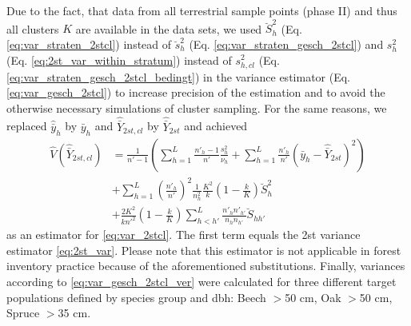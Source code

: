 Due to the fact, that data from all terrestrial sample points (phase II) and thus all clusters $K$ are available in the data sets, we used $\breve{S}_h^2$ (Eq. \ref{eq:var_straten_2stcl}) instead of $\breve{s}_h^2$ (Eq. \ref{eq:var_straten_gesch_2stcl}) and $s_{h}^2$ (Eq. \ref{eq:2st_var_within_stratum}) instead of $s_{h,cl}^2$ (Eq. \ref{eq:var_straten_gesch_2stcl_bedingt}) in the variance estimator (Eq. \ref{eq:var_gesch_2stcl}) to increase precision of the estimation and to avoid the otherwise necessary simulations of cluster sampling. For the same reasons, we replaced $\hat{\bar{y}}_h$ by $\bar{y}_h$ and $\hat{\bar{Y}}_{2st,cl}$ by $\hat{\bar{Y}}_{2st}$ and achieved
\begin{equation}
\begin{aligned}
\hat{V}\left(\hat{\bar{Y}}_{2st,cl}\right)&=\frac{1}{n'-1}\left(\sum_{h=1}^{L}\frac{n'_h-1}{n'}\frac{s^2_{h}}{\nu_h}+\sum_{h=1}^{L}\frac{n'_h}{n'}\left(\bar{y}_h-\hat{\bar{Y}}_{2st}\right)^2\right)\\
&+ \sum_{h=1}^{L}\left(\frac{n'_h}{n'}\right)^2 \frac{1}{n_h^2}\frac{K^2}{k}\left(1-\frac{k}{K}\right)\breve{S}_h^2\\
&+\frac{2K^2}{kn'^2}\left(1-\frac{k}{K}\right)\sum_{h<h'}^{L}\frac{n'_h n'_{h'}}{n_h n_{h'}}\breve{S}_{h h'}  
\label{eq:var_gesch_2stcl_ver}
\end{aligned}
\end{equation}
as an estimator for \eqref{eq:var_2stcl}. The first term equals the 2st variance estimator \eqref{eq:2st_var}. Please note that this estimator is not applicable in forest inventory practice because of the aforementioned substitutions. Finally, variances according to \eqref{eq:var_gesch_2stcl_ver} were calculated for three different target populations defined by species group and dbh: Beech $>$50 cm, Oak $>$50 cm, Spruce $>$35 cm.
